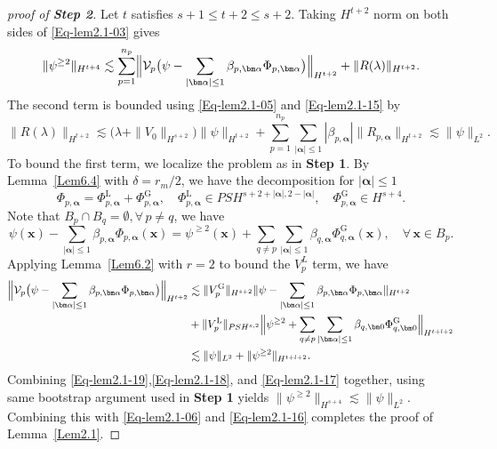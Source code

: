 \documentclass{sn-jnl}%
\numberwithin{equation}{section}
\theoremstyle{thmstyleone}%
\theoremstyle{thmstyletwo}%
\theoremstyle{thmstylethree}%
\begin{document}
\begin{appendices}
\begin{proof}[proof of \textbf{Step 2}]
    Let $t$ satisfies $s+1\leq t+2 \leq s+2$. Taking $H^{t+2}$ norm on both sides of \eqref{Eq-lem2.1-03} gives
    \begin{equation}\label{Eq-lem2.1-17}
        \| \psi^{\geq 2} \|_{H^{t+4}} \lesssim \sum_{p=1}^{n_p}\Bigl\|\mathcal{V}_p\bigl(\psi-\sum_{|\bm \alpha|\leq 1}\beta_{p,\bm \alpha}\Phi_{p,\bm \alpha}\bigr)\Bigr\|_{H^{t+2}}+\|R(\lambda)\|_{H^{t+2}}.
    \end{equation}
    The second term is bounded using \eqref{Eq-lem2.1-05} and \eqref{Eq-lem2.1-15} by
    \begin{equation}\label{Eq-lem2.1-18}
        \|R(\lambda)\|_{H^{t+2}} \lesssim \bigl(\lambda+\|V_0\|_{H^{s+2}}\bigr)\|\psi\|_{H^{t+2}} +\sum_{p=1}^{n_p}\sum_{|\bm \alpha|\leq 1} |\beta_{p,\bm \alpha}|\|R_{p,\bm \alpha}\|_{H^{t+2}}\lesssim \|\psi\|_{L^2}.
    \end{equation}
    To bound the first term, we localize the problem as in \textbf{Step 1}. By Lemma~\ref{Lem6.4}  with $\delta = r_m/2$, we have the decomposition for $|\bm \alpha|\leq 1$
    \[
    \Phi_{p,\bm \alpha} = \Phi_{p,\bm \alpha}^\mathrm{L} +\Phi_{p,\bm \alpha}^\mathrm{G},\quad\Phi_{p,\bm \alpha}^\mathrm{L}\in PSH^{s+2+|\bm \alpha|,2-|\bm \alpha|},\quad\Phi_{p,\bm \alpha}^\mathrm{G}\in H^{s+4}.
    \]
    Note that $B_p\cap B_q = \emptyset, \forall\, p\neq q$, we have  
    \[
        \psi(\bm x)-\sum_{|\bm \alpha|\leq 1}\beta_{p,\bm \alpha}\Phi_{p,\bm \alpha}(\bm x) = \psi^{\geq 2}(\bm x) +\sum_{q\neq p} \sum_{|\bm \alpha|\leq 1}\beta_{q,\bm \alpha}\Phi_{q,\bm \alpha}^{\mathrm{G}}(\bm x), \quad \forall\, \bm x\in B_p.
    \]
     Applying Lemma~\ref{Lem6.2} with $r=2$ to bound the $V_p^{L}$ term, we have 
     \begin{equation}\label{Eq-lem2.1-19}
       \begin{aligned}
            \Bigl\|\mathcal{V}_p\bigl(\psi-\sum_{|\bm \alpha|\leq 1}\beta_{p,\bm \alpha}\Phi_{p,\bm \alpha}\bigr)\Bigr\|_{H^{t+2}}
            &\lesssim  \|V_{p}^{\mathrm{G}}\|_{H^{s+2}}\|\psi-\sum_{|\bm \alpha|\leq 1}\beta_{p,\bm \alpha}\Phi_{p,\bm \alpha}\|_{H^{t+2}}\\
            &+ \|V_p^{\mathrm{L}}\|_{PSH^{s,2}}\Bigl\|\psi^{\geq 2}+\sum_{q\neq p}\sum_{|\bm \alpha|\leq 1}\beta_{q,\bm 0}\Phi_{q,\bm 0}^{\mathrm{G}}\Bigr\|_{H^{t+l+2}}\\
            &\lesssim \|\psi\|_{L^2}+\|\psi^{\geq 2}\|_{H^{t+l+2}}.
       \end{aligned}
    \end{equation}
    Combining \eqref{Eq-lem2.1-19},\eqref{Eq-lem2.1-18}, and \eqref{Eq-lem2.1-17} together, using same bootstrap argument used in \textbf{Step 1} yields $\|\psi^{\geq 2}\|_{H^{s+4}}\lesssim \|\psi\|_{L^2}$. Combining this with \eqref{Eq-lem2.1-06} and \eqref{Eq-lem2.1-16} completes the proof of Lemma~\ref{Lem2.1}.
\end{proof}

\end{appendices}
\end{document}
